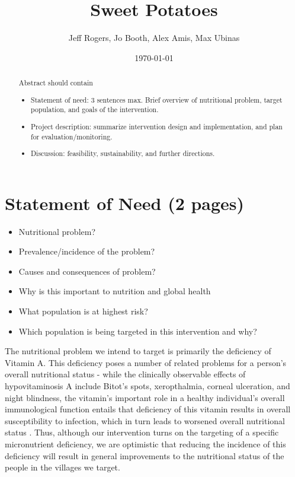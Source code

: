 \documentclass[12pt, letterpaper, draft]{article}
\begin{document}
\title{Sweet Potatoes}
\author{Jeff Rogers, Jo Booth, Alex Amis, Max Ubinas}
\date{\today}
\maketitle



\begin{abstract}
Abstract should contain
\begin{itemize}
    \item Statement of need: 3 sentences max. Brief overview of nutritional
    problem, target population, and goals of the intervention.
    \item Project description: summarize intervention design and implementation,
    and plan for evaluation/monitoring.
    \item Discussion: feasibility, sustainability, and further directions.
\end{itemize}
\end{abstract}

\section{Statement of Need (2 pages)}
\begin{itemize}
    \item Nutritional problem?
    \item Prevalence/incidence of the problem?
    \item Causes and consequences of problem?
    \item Why is this important to nutrition and global health
    \item What population is at highest risk?
    \item Which population is being targeted in this intervention and why?
\end{itemize}

The nutritional problem we intend to target is primarily the deficiency of Vitamin A. This deficiency poses a number of related problems for a person's overall nutritional status - while the clinically observable effects of hypovitaminosis A include Bitot's spots, xeropthalmia, corneal ulceration, and night blindness, the vitamin's important role in a healthy individual's overall immunological function entails that deficiency of this vitamin results in overall susceptibility to infection, which in turn leads to worsened overall nutritional status \cite{underwood1978hypovitaminosis}. Thus, although our intervention turns on the targeting of a specific micronutrient deficiency, we are optimistic that reducing the incidence of this deficiency will result in general improvements to the nutritional status of the people in the villages we target.
\end{document}
